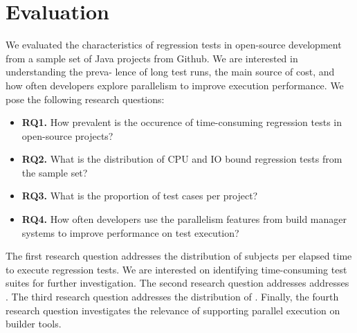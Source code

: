 \section{Evaluation}
\label{sec:eval}


We evaluated the characteristics of regression tests in
open-source development from a sample set of Java projects
from Github. We are interested in understanding the preva-
lence of long test runs, the main source of cost, and how
often developers explore parallelism to improve execution
performance. We pose the following research questions:

\newcommand{\RQONE}{How prevalent is the occurence of time-consuming
regression tests in open-source projects?}
\newcommand{\RQTWO}{What is the distribution of CPU and IO bound
regression tests from the sample set?}
\newcommand{\RQTHREE}{What is the proportion of \Fix{time-consuming?}
test cases per project?}
\newcommand{\RQFOUR}{How often developers use the parallelism features
from build manager systems to improve performance on test execution?}

\newcommand{\rqA}{\textbf{RQ1.} \RQONE}
\newcommand{\rqB}{\textbf{RQ2.} \RQTWO}
\newcommand{\rqC}{\textbf{RQ3.} \RQTHREE}
\newcommand{\rqD}{\textbf{RQ4.} \RQFOUR}

\begin{itemize}
    \item \rqA
    \item \rqB
    \item \rqC
    \item \rqD
\end{itemize}

The first research question addresses the distribution of subjects per
elapsed time to execute regression tests. We are interested on
identifying time-consuming test suites for further investigation. The
second research question addresses addresses . The third
research question addresses the distribution of . Finally,
the fourth research question investigates the relevance of supporting
parallel execution on builder tools.

